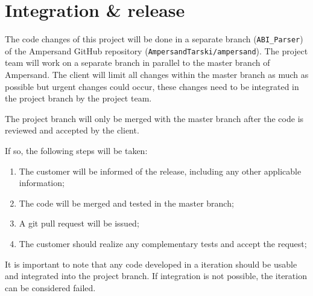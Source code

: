 
\section{Integration \& release}
\label{sec:integration-release}
%
%
The code changes of this project will be done in a separate branch (\texttt{ABI\_Parser}) of the Ampersand GitHub repository (\texttt{AmpersandTarski/ampersand}).
The project team will work on a separate branch in parallel to the master branch of Ampersand.
The client will limit all changes within the master branch as much as possible but urgent changes could occur, these changes need to be integrated in the project branch by the project team. 

The project branch will only be merged with the master branch after the code is reviewed and accepted by the client.

If so, the following steps will be taken:
\begin{enumerate}
	\item The customer will be informed of the release, including any other applicable information;
	\item The code will be merged and tested in the master branch;
	\item A git pull request will be issued;
	\item The customer should realize any complementary tests and accept the request;
\end{enumerate}
%
It is important to note that any code developed in a iteration should be usable and integrated into the project branch.
If integration is not possible, the iteration can be considered failed.